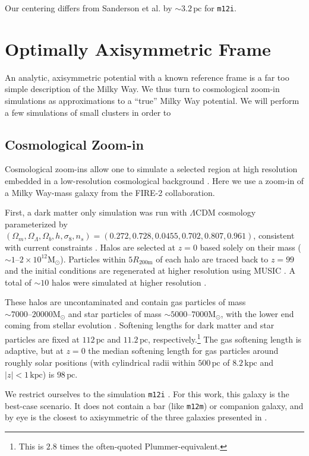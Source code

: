 \documentclass[twocolumn]{aastex62}
\newcommand{\Msun}{\text{M}_\odot}
\newcommand{\pc}{\text{pc}}
\newcommand{\kpc}{\text{kpc}}
\newcommand{\abs}[1]{\left| #1 \right|}
\newcommand{\z}{z}
\newcommand{\mi}{\texttt{m12i}}
\begin{document}
Our centering differs from Sanderson et al. by $\sim3.2\,\pc$ for \mi.


\section{Optimally Axisymmetric Frame}
An analytic, axisymmetric potential with a known reference frame is a far too
simple description of the Milky Way. We thus turn to cosmological zoom-in
simulations as approximations to a ``true'' Milky Way potential. We will perform a few simulations of small clusters in order to 

\subsection{Cosmological Zoom-in} \label{ssec:cosmozoom}
Cosmological zoom-ins allow one to simulate a selected region at high
resolution embedded in a low-resolution cosmological background
\citep[e.g.][]{1993ApJ...412..455K,2014MNRAS.437.1894O}. Here we use a
zoom-in of a Milky Way-mass galaxy from the FIRE-2 collaboration.

First, a dark matter only simulation was run with $\Lambda$CDM cosmology
parameterized by $(\Omega_m, \Omega_{\Lambda}, \Omega_b, h, \sigma_8, n_s) =
(0.272, 0.728, 0.0455, 0.702, 0.807, 0.961)$, consistent with current
constraints \citep{2018arXiv180706209P}. Halos are selected at $z=0$ based
solely on their mass ($\sim 1\text{--}2 \times 10^{12} \Msun$). Particles
within $5 R_{200\text{m}}$ of each halo are traced back to $\z=99$ and the
initial conditions are regenerated at higher resolution using MUSIC
\citep{2011MNRAS.415.2101H}. A total of $\sim 10$ halos were simulated at
higher resolution \citep{2018MNRAS.481.4133G}.

These halos are uncontaminated and contain gas particles of mass $\sim 7000
\text{--} 20000 \Msun$ and star particles of mass $\sim 5000 \text{--} 7000
\Msun$, with the lower end coming from stellar evolution
\citep{2018arXiv180610564S}. Softening lengths for dark matter and star
particles are fixed at $112\,\pc$ and $11.2\,\pc$,
respectively.\footnote{This is $2.8$ times the often-quoted
Plummer-equivalent.} The gas softening length is adaptive, but at $z=0$ the
median softening length for gas particles around roughly solar positions
(with cylindrical radii within $500\,\pc$ of $8.2\,\kpc$ and
$\abs{z}<1\,\kpc$) is $98\,\pc$.

We restrict ourselves to the simulation \texttt{m12i} \citep[first introduced
in][]{2016ApJ...827L..23W}. For this work, this galaxy is the best-case
scenario. It does not contain a bar (like \texttt{m12m}) or companion galaxy,
and by eye is the closest to axisymmetric of the three galaxies presented in
\citet{2018arXiv180610564S} \citep{2018MNRAS.481.4133G}.
\end{document}
